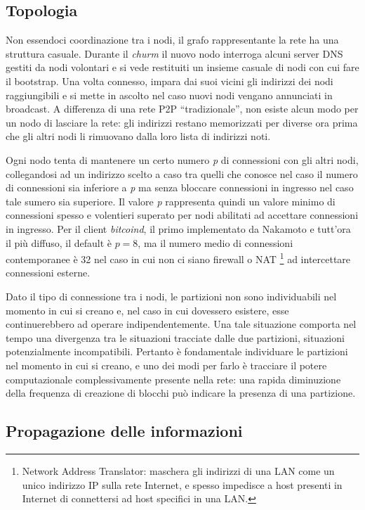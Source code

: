 \subsection{Topologia}\label{topologia}

Non essendoci coordinazione tra i nodi, il grafo rappresentante la rete ha una struttura casuale. Durante il \emph{churm} il nuovo nodo interroga alcuni server DNS gestiti da nodi volontari e si vede restituiti un insieme casuale di nodi con cui fare il bootstrap. Una volta connesso, impara dai suoi vicini gli indirizzi dei nodi raggiungibili e si mette in ascolto nel caso nuovi nodi vengano annunciati in broadcast. A differenza di una rete P2P ``tradizionale'', non esiste alcun modo per un nodo di lasciare la rete: gli indirizzi restano memorizzati per diverse ora prima che gli altri nodi li rimuovano dalla loro lista di indirizzi noti.

Ogni nodo tenta di mantenere un certo numero \emph{p} di connessioni con gli altri nodi, collegandosi ad un indirizzo scelto a caso tra quelli che conosce nel caso il numero di connessioni sia inferiore a \emph{p} ma senza bloccare connessioni in ingresso nel caso tale sumero sia superiore. Il valore \emph{p} rappresenta quindi un valore minimo di connessioni spesso e volentieri superato per nodi abilitati ad accettare connessioni in ingresso. Per il client \emph{bitcoind}, il primo implementato da Nakamoto e tutt'ora il più diffuso, il default è $p=8$, ma il numero medio di connessioni contemporanee è 32 nel caso in cui non ci siano firewall o NAT \footnote{Network Address Translator: maschera   gli indirizzi di una LAN come un unico indirizzo IP sulla rete   Internet, e spesso impedisce a host presenti in Internet di   connettersi ad host specifici in una LAN.} ad intercettare connessioni esterne.

Dato il tipo di connessione tra i nodi, le partizioni non sono individuabili nel momento in cui si creano e, nel caso in cui dovessero esistere, esse continuerebbero ad operare indipendentemente. Una tale situazione comporta nel tempo una divergenza tra le situazioni tracciate dalle due partizioni, situazioni potenzialmente incompatibili. Pertanto è fondamentale individuare le partizioni nel momento in cui si creano, e uno dei modi per farlo è tracciare il potere computazionale complessivamente presente nella rete: una rapida diminuzione della frequenza di creazione di blocchi può indicare la presenza di una partizione.

\subsection{Propagazione delle informazioni}\label{propagazione-delle-informazioni}

